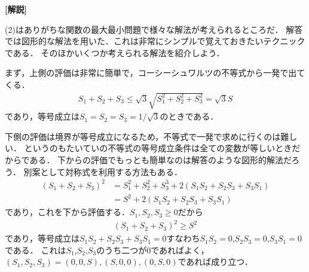 \documentclass[a4paper,10pt]{ltjsarticle}
\begin{document}
\begin{multicols}{2}
  \vspace{10pt}
  {\bf[解説]}

  (2)はありがちな関数の最大最小問題で様々な解法が考えられるところだ．
  解答では図形的な解法を用いた．これは非常にシンプルで覚えておきたいテクニックである．
  そのほかいくつか考えられる解法を紹介しよう．

  まず，上側の評価は非常に簡単で，コーシーシュワルツの不等式から一発で出てくる．
  \begin{align*}
    S_1+S_2+S_3 \le \sqrt{3}\sqrt{S_1^2+S_2^2+S_3^2} = \sqrt{3}S
  \end{align*}
  であり，等号成立は$S_1=S_2=S_3=1/\sqrt{3}$のときである．

  下側の評価は境界が等号成立になるため，不等式で一発で求めに行くのは難しい．
  というのもたいていの不等式の等号成立条件は全ての変数が等しいときだからである．
  下からの評価でもっとも簡単なのは解答のような図形的解法だろう．
  別案として対称式を利用する方法もある．
  \begin{align*}
    (S_1+S_2+S_3)^2
     & = S_1^2+S_2^2+S_3^3 + 2(S_1S_2+S_2S_3+S_3S_1) \\
     & = S^2 + 2(S_1S_2+S_2S_3+S_3S_1)
  \end{align*}
  であり，これを下から評価する．$S_1,S_2,S_3\ge 0$だから
  \begin{align*}
    (S_1+S_2+S_3)^2 \ge S^2
  \end{align*}
  であり，等号成立は$S_1S_2+S_2S_3+S_3S_1=0$すなわち$S_1S_2=0$,$S_2S_3=0$,$S_3S_1=0$である．
  これは$S_1$,$S_2$,$S_3$のうち二つが$0$であればよく，$(S_1,S_2,S_3)=(0,0,S),(S,0,0),(0,S,0)$であれば成り立つ．


\end{multicols}
\end{document}
